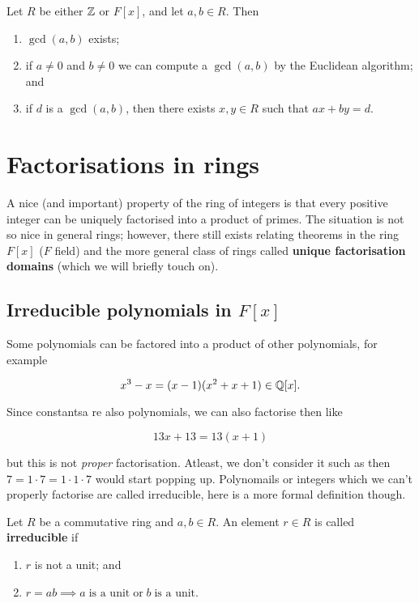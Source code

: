 
\begin{theorem}
    Let $R$ be either $\mathbb{Z}$ or $F[x]$, and let $a, b \in R$. Then
    \begin{enumerate}
        \item $\gcd{(a, b)}$ exists;
        \item if $a \neq 0$ and $b \neq 0$ we can compute a $\gcd{(a, b)}$ by the Euclidean algorithm; and
        \item if $d$ is a $\gcd{(a, b)}$, then there exists $x, y \in R$ such that $ax + by = d$.
    \end{enumerate}
\end{theorem}

\chapter{Factorisations in rings}

A nice (and important) property of the ring of integers is that every positive integer can be uniquely factorised into a product of primes. The situation is not so nice in general rings; however, there still exists relating theorems in the ring $F[x]$ ($F$ field) and the more general class of rings called \textbf{unique factorisation domains} (which we will briefly touch on).

\section{Irreducible polynomials in $F[x]$}

Some polynomials can be factored into a product of other polynomials, for example

\[ x^3 - x = (x - 1)(x^2 + x + 1) \in \mathbb{Q}[x]. \]

Since constantsa re also polynomials, we can also factorise then like

\[ 13x + 13 = 13 (x + 1) \]

but this is not \emph{proper} factorisation. Atleast, we don't consider it such as then $7 = 1 \cdot 7 = 1 \cdot 1 \cdot 7$ would start popping up. Polynomails or integers which we can't properly factorise are called irreducible, here is a more formal definition though.

\begin{definition}[Irreducible]
    Let $R$ be a commutative ring and $a, b \in R$. An element $r \in R$ is called \textbf{irreducible} if
    \begin{enumerate}
        \item $r$ is not a unit; and
        \item $r = ab \implies a \;\text{is a unit}\; \text{or}\; b \;\text{is a unit}$.
    \end{enumerate}
\end{definition}

